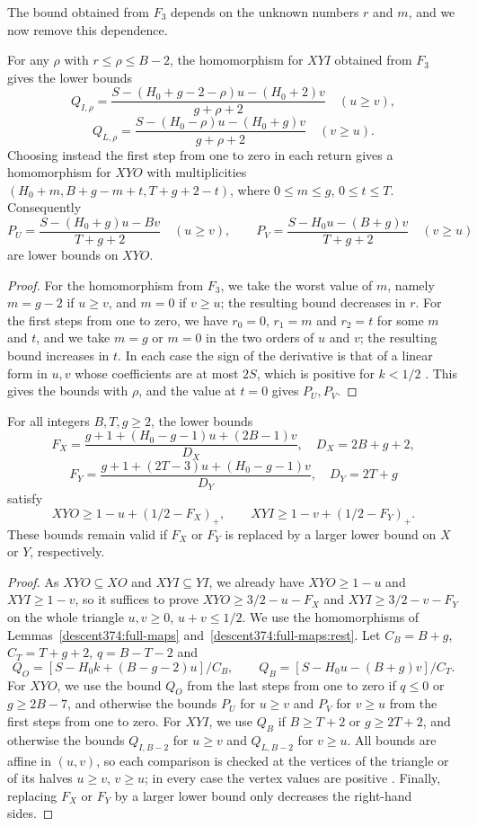 The bound obtained from $F_3$ depends on the unknown numbers $r$ and $m$, and we now remove this dependence.

\begin{lemma}
\label{descent374:full-maps:rest}
For any $\rho$ with $r\le\rho\le B-2$, the homomorphism for $XYI$ obtained from $F_3$ gives the lower bounds
\[
 Q_{I,\rho}=\frac{S-(H_0+g-2-\rho)u-(H_0+2)v}{g+\rho+2}
 \quad(u\ge v),
\]
\[
 Q_{L,\rho}=\frac{S-(H_0-\rho)u-(H_0+g)v}{g+\rho+2}
 \quad(v\ge u).
\]
Choosing instead the first step from one to zero in each return gives
a homomorphism for $XYO$ with multiplicities
$(H_0+m,B+g-m+t,T+g+2-t)$, where
$0\le m\le g$, $0\le t\le T$. Consequently
\[
 P_U=\frac{S-(H_0+g)u-Bv}{T+g+2}\quad(u\ge v),\qquad
 P_V=\frac{S-H_0u-(B+g)v}{T+g+2}\quad(v\ge u)
\]
are lower bounds on $XYO$.
\end{lemma}
\begin{proof}
For the homomorphism from $F_3$, we take the worst value of $m$, namely
$m=g-2$ if $u\ge v$, and $m=0$ if $v\ge u$; the resulting bound
decreases in $r$. For the first steps from one to zero, we have $r_0=0$, $r_1=m$ and $r_2=t$ for some $m$ and $t$,
and we take $m=g$ or $m=0$ in the two orders of $u$ and $v$; the resulting
bound increases in $t$. In each case the sign of the derivative is that
of a linear form in $u,v$ whose coefficients are at most $2S$, which is
positive for $k<1/2$ . This gives the bounds with $\rho$, and
the value at $t=0$ gives $P_U,P_V$.
\end{proof}

\begin{lemma}
\label{descent378:top-two-cyclic}
\label{descent378:universal-X-cyclic}
\label{descent378:universal-Y-cyclic}
For all integers $B,T,g\ge2$, the
lower bounds
\[
 F_X=\frac{g+1+(H_0-g-1)u+(2B-1)v}{D_X},\quad D_X=2B+g+2,
\]
\[
 F_Y=\frac{g+1+(2T-3)u+(H_0-g-1)v}{D_Y},\quad D_Y=2T+g
\]
satisfy
\[
 XYO\ge1-u+(1/2-F_X)_+,\qquad
 XYI\ge1-v+(1/2-F_Y)_+.
\]
These bounds remain valid if $F_X$ or $F_Y$ is replaced by a larger lower bound
on $X$ or $Y$, respectively.
\end{lemma}
\begin{proof}
As $XYO\subseteq XO$ and $XYI\subseteq YI$, we already have $XYO\ge1-u$ and $XYI\ge1-v$, so it suffices to prove
$XYO\ge3/2-u-F_X$ and $XYI\ge3/2-v-F_Y$ on the whole
triangle $u,v\ge0$, $u+v\le1/2$.
We use the homomorphisms of Lemmas~\ref{descent374:full-maps} and~\ref{descent374:full-maps:rest}. Let
$C_B=B+g$, $C_T=T+g+2$, $q=B-T-2$ and
\[
 Q_O=[S-H_0k+(B-g-2)u]/C_B,\qquad
 Q_B=[S-H_0u-(B+g)v]/C_T.
\]
For $XYO$, we use the bound $Q_O$ from the last steps from one to zero if $q\le0$ or $g\ge2B-7$, and
otherwise the bounds $P_U$ for $u\ge v$ and $P_V$ for $v\ge u$ from the first steps from one to zero.
For $XYI$, we use $Q_B$ if $B\ge T+2$ or $g\ge2T+2$, and otherwise the
bounds $Q_{I,B-2}$ for $u\ge v$ and $Q_{L,B-2}$ for $v\ge u$.
All bounds are affine in $(u,v)$, so each comparison is checked at the
vertices of the triangle or of its halves $u\ge v$, $v\ge u$; in every
case the vertex values are positive .
Finally, replacing $F_X$ or $F_Y$ by a larger lower bound only decreases the right-hand sides.
\end{proof}

